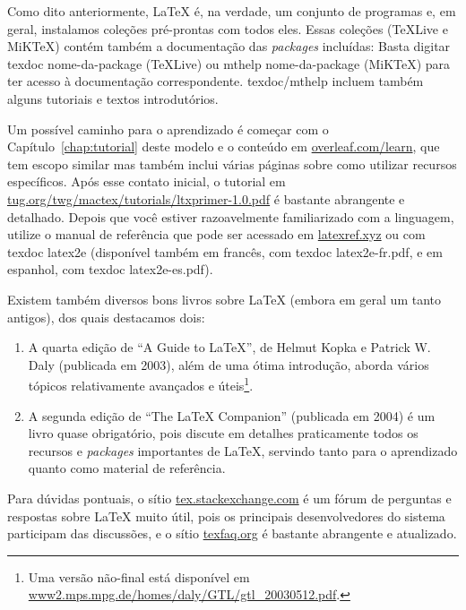 Como dito anteriormente, \LaTeX{} é, na verdade, um conjunto de programas
e, em geral, instalamos coleções pré-prontas com todos eles. Essas coleções
(\TeX{}Live e MiK\TeX{}) contém também a documentação das \textit{packages}
incluídas: Basta digitar \textsf{texdoc nome-da-package} (\TeX{}Live) ou
\textsf{mthelp nome-da-package} (MiK\TeX{}) para ter acesso à documentação
correspondente. \textsf{texdoc/mthelp} incluem também alguns tutoriais e
textos introdutórios.

Um possível caminho para o aprendizado é começar com o
Capítulo~\ref{chap:tutorial} deste modelo e o conteúdo em
\url{overleaf.com/learn}, que tem escopo similar mas também inclui várias
páginas sobre como utilizar recursos específicos. Após esse contato inicial,
o tutorial em \url{tug.org/twg/mactex/tutorials/ltxprimer-1.0.pdf} é
bastante abrangente e detalhado. Depois que você estiver razoavelmente
familiarizado com a linguagem, utilize o manual de referência que pode ser
acessado em \url{latexref.xyz} ou com \textsf{texdoc latex2e} (disponível
também em francês, com \textsf{texdoc latex2e-fr.pdf}, e em espanhol, com
\textsf{texdoc latex2e-es.pdf}).

Existem também diversos bons livros sobre \LaTeX{} (embora em geral um
tanto antigos), dos quais destacamos dois:

\begin{enumerate}

  \item A quarta edição de ``A Guide to \LaTeX'', de Helmut Kopka
        e Patrick W. Daly (publicada em 2003), além de uma ótima
        introdução, aborda vários tópicos relativamente avançados
        e úteis\footnote{Uma versão não-final está disponível em
        \url{www2.mps.mpg.de/homes/daly/GTL/gtl_20030512.pdf}.}.
  \item A segunda edição de ``The \LaTeX{} Companion'' (publicada em
        2004) é um livro quase obrigatório, pois discute em detalhes
        praticamente todos os recursos e \textit{packages} importantes
        de \LaTeX{}, servindo tanto para o aprendizado quanto como
        material de referência.

\end{enumerate}

Para dúvidas pontuais, o sítio \url{tex.stackexchange.com} é um
fórum de perguntas e respostas sobre \LaTeX{} muito útil, pois os
principais desenvolvedores do sistema participam das discussões, e o
sítio \url{texfaq.org} é bastante abrangente e atualizado.

